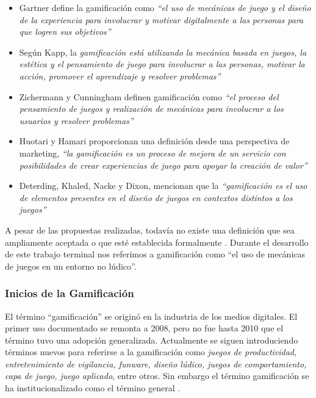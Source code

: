     \begin{itemize}

        \item Gartner define la gamificación como {\it ``el uso de mecánicas de juego y
        el diseño de la experiencia para involucrar y motivar digitalmente a las personas para
        que logren sus objetivos''} \cite{Burke}

        \item Según Kapp, la {\it gamificación está utilizando la mecánica basada en juegos,
        la estética y el pensamiento de juego para involucrar a las personas, motivar la acción,
        promover el aprendizaje y resolver problemas''} \cite{Kapp}

        \item Zichermann y Cunningham definen gamificación como {\it ``el proceso del
        pensamiento de juegos y realización de mecánicas para involucrar a los usuarios y resolver
        problemas''} \cite{GamByDesign} %

        \item Huotari y Hamari proporcionan una definición desde una perspectiva de marketing,
        {\it ``la gamificación es un proceso de mejora de un servicio con posibilidades de crear
        experiencias de juego para apoyar la creación de valor''} \cite{Huotari}  %

        \item Deterding, Khaled, Nacke y Dixon, mencionan que la {\it ``gamificación
        es el uso de elementos presentes en el diseño de juegos en contextos distintos a
        los juegos''} \cite{DeterdingDefinition} %

    \end{itemize}

 \noindent A pesar de las propuestas realizadas, todavía no existe una definición que sea ampliamente aceptada o que esté establecida formalmente \cite{Seaborn}. Durante el desarrollo de este trabajo terminal nos referimos a gamificación como ``el uso de mecánicas de juegos en un entorno no lúdico''.

\subsubsection{Inicios de la Gamificación}

 El término ``gamificación'' se originó en la industria de los medios digitales. El primer uso documentado se remonta a 2008, pero no fue hasta 2010 que el término tuvo una adopción generalizada. Actualmente se siguen introduciendo términos nuevos para referirse a la gamificación como {\it juegos de productividad, entretenimiento de vigilancia, funware, diseño lúdico, juegos de comportamiento, capa de juego, juego aplicado}, entre otros. Sin embargo el término gamificación se ha institucionalizado como el término general \cite{DeterdingGamefulness}.\\


